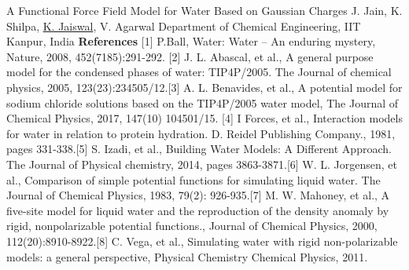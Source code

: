 \begin{abstract_online}{A Functional Force Field Model for Water Based on Gaussian Charges }{%
        J. Jain, K. Shilpa, \underline{K. Jaiswal}, V. Agarwal}{%
        }{%
        Department of Chemical Engineering, IIT Kanpur, India}
        \textbf{References} \newline{}[1] P.Ball, Water: Water – An enduring mystery, Nature, 2008, 452(7185):291-292. \newline{}[2] J. L. Abascal, et al., A general purpose model for the condensed phases of water: TIP4P/2005. The Journal of chemical physics, 2005, 123(23):234505/12.\newline{}[3] A. L. Benavides, et al., A potential model for sodium chloride solutions based on the TIP4P/2005 water model, The Journal of Chemical Physics, 2017, 147(10) 104501/15. \newline{}[4] I Forces, et al., Interaction models for water in relation to protein hydration. D. Reidel Publishing Company., 1981, pages 331-338.\newline{}[5] S. Izadi, et al., Building Water Models: A Different Approach. The Journal of Physical chemistry, 2014, pages 3863-3871.\newline{}[6] W. L. Jorgensen, et al., Comparison of simple potential functions for simulating liquid water. The Journal of Chemical Physics, 1983, 79(2): 926-935.\newline{}[7] M. W. Mahoney, et al., A five-site model for liquid water and the reproduction of the density anomaly by rigid, nonpolarizable potential functions., Journal of Chemical Physics, 2000, 112(20):8910-8922.\newline{}[8] C. Vega, et al., Simulating water with rigid non-polarizable models: a general perspective, Physical Chemistry Chemical Physics, 2011. 
    \end{abstract_online}
    